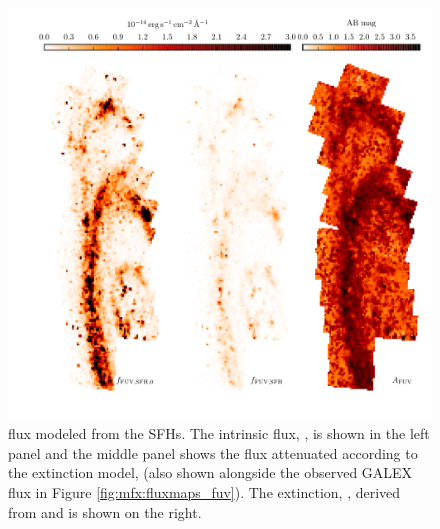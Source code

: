 \documentclass[iop, tighten]{emulateapj}
\begin{document}
\begin{figure}
\centering
\includegraphics[width=\textwidth]{m31flux-figures/modfluxmaps_fuv.pdf}
\caption[\fuv{} flux map modeled from the SFHs.]{\fuv{} flux modeled from the SFHs.
    The intrinsic flux, \ffuvsfhz{}, is shown in the left panel and the middle
    panel shows the flux attenuated according to the extinction model, \ffuvsfh{}
    (also shown alongside the observed GALEX \fuv{} flux in Figure
    \ref{fig:mfx:fluxmaps_fuv}). The \fuv{} extinction, \afuv{}, derived from
    \ffuvsfhz{} and \ffuvsfh{} is shown on the right.
}
\label{fig:mfx:modfluxmaps_fuv}
\end{figure}
\end{document}

